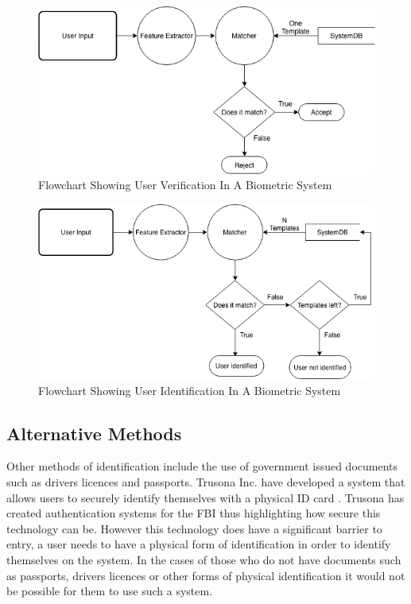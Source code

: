 \documentclass[12pt]{article}
\begin{document}
		\begin{figure}[H]
	    \centering
	    \includegraphics[width=\textwidth]{biometric_flowcharts-Verification.png}
	    \caption{Flowchart Showing User Verification In A Biometric System \citep{jain2004introduction}}
	    \label{fig:flowchat:verification}
	\end{figure}
	
		\begin{figure}[H]
	    \centering
	    \includegraphics[width=\textwidth]{biometric_flowcharts-Identification.png}
	    \caption{Flowchart Showing User Identification In A Biometric System \citep{jain2004introduction}}
	    \label{fig:flowchat:identification}
	\end{figure}
	
	\subsection{Alternative Methods}
	Other methods of identification include the use of government issued documents such as drivers licences and passports.
	Trusona Inc. have developed a system that allows users to securely identify themselves with a physical ID card \citep{eisen2017systems}. Trusona has created authentication systems for the FBI \citep{abagnale_2017} thus highlighting how secure this technology can be. However this technology does have a significant barrier to entry, a user needs to have a physical form of identification in order to identify themselves on the system. In the cases of those who do not have documents such as passports, drivers licences or other forms of physical identification it would not be possible for them to use such a system.
	
\end{document}
